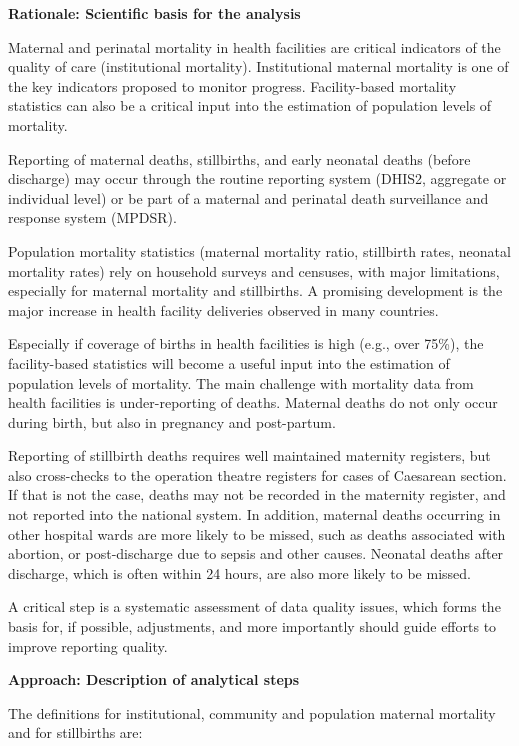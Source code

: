 \documentclass[
  english,
  letterpaper,
  DIV=11,
  numbers=noendperiod]{scrreprt}
\begin{document}
\textbf{Rationale: Scientific basis for the analysis}

Maternal and perinatal mortality in health facilities are critical
indicators of the quality of care (institutional mortality).
Institutional maternal mortality is one of the key indicators proposed
to monitor progress. Facility-based mortality statistics can also be a
critical input into the estimation of population levels of mortality.

Reporting of maternal deaths, stillbirths, and early neonatal deaths
(before discharge) may occur through the routine reporting system
(DHIS2, aggregate or individual level) or be part of a maternal and
perinatal death surveillance and response system (MPDSR).

Population mortality statistics (maternal mortality ratio, stillbirth
rates, neonatal mortality rates) rely on household surveys and censuses,
with major limitations, especially for maternal mortality and
stillbirths. A promising development is the major increase in health
facility deliveries observed in many countries.

Especially if coverage of births in health facilities is high (e.g.,
over 75\%), the facility-based statistics will become a useful input
into the estimation of population levels of mortality. The main
challenge with mortality data from health facilities is under-reporting
of deaths. Maternal deaths do not only occur during birth, but also in
pregnancy and post-partum.

Reporting of stillbirth deaths requires well maintained maternity
registers, but also cross-checks to the operation theatre registers for
cases of Caesarean section. If that is not the case, deaths may not be
recorded in the maternity register, and not reported into the national
system. In addition, maternal deaths occurring in other hospital wards
are more likely to be missed, such as deaths associated with abortion,
or post-discharge due to sepsis and other causes. Neonatal deaths after
discharge, which is often within 24 hours, are also more likely to be
missed.

A critical step is a systematic assessment of data quality issues, which
forms the basis for, if possible, adjustments, and more importantly
should guide efforts to improve reporting quality.

\textbf{Approach: Description of analytical steps}

The definitions for institutional, community and population maternal
mortality and for stillbirths are:
\end{document}
